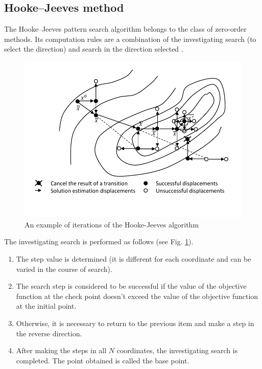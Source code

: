 \documentclass{svproc}
\begin{document}
\subsection{Hooke--Jeeves method}\label{SecHG}

The Hooke--Jeeves pattern search algorithm belongs to the class of zero-order methods. Its computation rules are a  combination of the investigating search (to select the direction) and search in the direction selected  \cite{Himmelblau72}.

\begin{figure} 
	\begin{center} 
		\begin{minipage}[h]{0.8\linewidth} 
			\includegraphics[width=1\linewidth]{figure/fig1.pdf} 
			\caption{An example of iterations of the Hooke-Jeeves algorithm} %
			\label{fig:fig1} 
		\end{minipage} 
	\end{center} 
\end{figure}	


The investigating search is performed as follows (see Fig. \ref{fig:fig1}).
\begin{enumerate} 
\item	The step value is determined (it is different for each coordinate and can be varied in the course  of search).  
\item	The search step is considered to be successful if the value of the objective function at the check  point doesn't exceed the value of the objective function at the initial point.  
\item	Otherwise, it is necessary to return to the previous item and make a step in the reverse direction.  
\item	After making the steps in all $N$ coordinates, the investigating search is completed. The point  obtained is called the base point. 
\end{enumerate}
\end{document}
